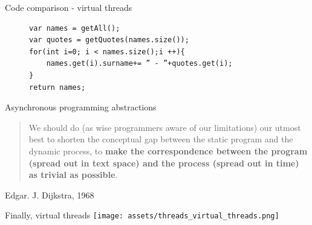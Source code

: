\documentclass{beamer}
\begin{document}
\begin{frame}[fragile]{Code comparison - virtual threads}
    \begin{figure}
        \begin{lstlisting}
var names = getAll();
var quotes = getQuotes(names.size());
for(int i=0; i < names.size();i ++){
    names.get(i).surname+= ” - ”+quotes.get(i);
}
return names;
        \end{lstlisting}
    \end{figure}
\end{frame}
\begin{frame}{Asynchronous programming abstractions}
    \begin{quote}
        We should do (as wise programmers aware of our limitations) our utmost best to shorten the conceptual gap between the static program and the dynamic process, to \textbf{make the correspondence between the program (spread out in text space) and the process (spread out in time) as trivial as possible}.
    \end{quote}
    Edgar. J. Dijkstra, 1968
\end{frame}
\begin{frame}{Finally, virtual threads}
    \texttt{[image: assets/threads\_virtual\_threads.png]}
\end{frame}
\end{document}
